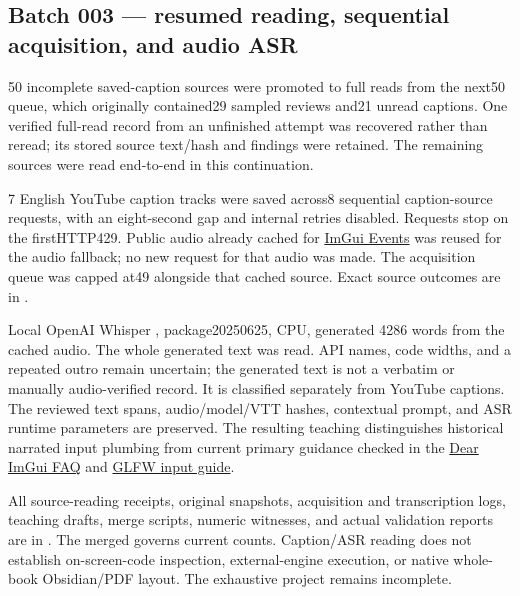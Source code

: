 \subsection{Batch 003 --- resumed reading, sequential acquisition, and audio ASR}\label{appendix-877738f6f4d2-batch-003-resumed-reading-sequential-acquisition-and-audio-asr}

\hypertarget{appendix-877738f6f4d2-batch-003-resumed-reading-sequential-acquisition-and-audio-asr}{}

50 incomplete saved-caption sources were promoted to full reads from the next50 queue, which originally contained29 sampled reviews and21 unread captions. One verified full-read record from an unfinished attempt was recovered rather than reread; its stored source text/hash and findings were retained. The remaining sources were read end-to-end in this continuation.

7 English YouTube caption tracks were saved across8 sequential caption-source requests, with an eight-second gap and internal retries disabled. Requests stop on the firstHTTP429. Public audio already cached for \href{https://www.youtube.com/watch?v=yBP1gSbQPPM}{ImGui Events} was reused for the audio fallback; no new request for that audio was made. The acquisition queue was capped at49 alongside that cached source. Exact source outcomes are in .

Local OpenAI Whisper , package20250625, CPU, generated 4286 words from the cached audio. The whole generated text was read. API names, code widths, and a repeated outro remain uncertain; the generated text is not a verbatim or manually audio-verified record. It is classified separately from YouTube captions. The reviewed text spans, audio/model/VTT hashes, contextual prompt, and ASR runtime parameters are preserved. The resulting teaching distinguishes historical narrated input plumbing from current primary guidance checked in the \href{https://github.com/ocornut/imgui/blob/master/docs/FAQ.md}{Dear ImGui FAQ} and \href{https://www.glfw.org/docs/latest/input_guide.html}{GLFW input guide}.

All source-reading receipts, original snapshots, acquisition and transcription logs, teaching drafts, merge scripts, numeric witnesses, and actual validation reports are in . The merged  governs current counts. Caption/ASR reading does not establish on-screen-code inspection, external-engine execution, or native whole-book Obsidian/PDF layout. The exhaustive project remains incomplete.

